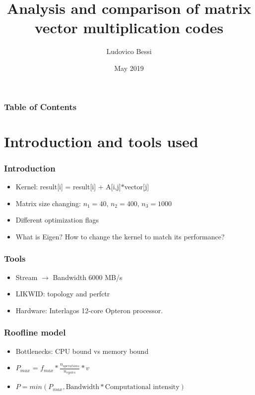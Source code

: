 \documentclass{beamer}
\title {Analysis and comparison of matrix vector multiplication codes}
\author %
{Ludovico Bessi}
\institute[VFU] %
{
  Matematica per l'ingegneria\\
  Politecnico di Torino
}
\date{May 2019}
\begin{document}
 
\frame{\titlepage}

\begin{frame}
\frametitle{Table of Contents}
\tableofcontents
\end{frame}

\section{Introduction and tools used}
\begin{frame}
\frametitle{Introduction}
\begin{itemize}
 \item Kernel: result[i] = result[i] + A[i,j]$*$vector[j]
 \item Matrix size changing: $n_1 = 40$, $n_2 = 400$, $n_3 = 1000$
 \item Different optimization flags 
 \item What is Eigen? How to change the kernel to match its performance?
\end{itemize}
\end{frame}

\begin{frame}
\frametitle{Tools}
\begin{itemize}
\item  Stream $\to$ Bandwidth 6000 MB/s
\item LIKWID: topology and perfctr
\item Hardware: Interlagos 12-core Opteron processor.
\end{itemize}
\end{frame}

\begin{frame}
\frametitle{Roofline model}


\begin{itemize}
\item  Bottlenecks: CPU bound vs memory bound
\item  $P_{max}$ = $f_{max} * \frac{n_{operations}}{n_{cycles}} * v$
\item  $P = min(P_{max}, \text{Bandwidth} * \text{Computational intensity})$
\end{itemize}




\end{frame}


\end{document}
